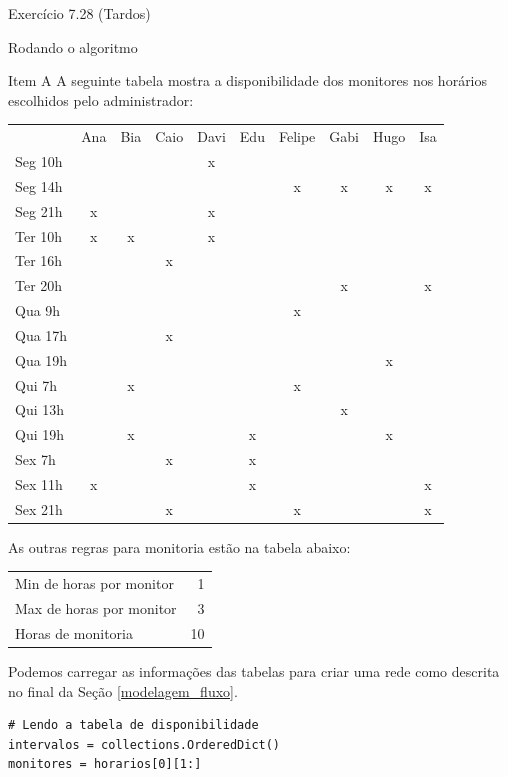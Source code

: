 \documentclass[presentation]{beamer}
\begin{document}
\begin{frame}[fragile,label=sec-2]{Exercício 7.28 (Tardos)}
\begin{block}{Rodando o algoritmo}
\begin{block}{Item A}
A seguinte tabela mostra a disponibilidade dos monitores nos horários
escolhidos pelo administrador:

\begin{center}
\begin{tabular}{lccccccccc}
 & Ana & Bia & Caio & Davi & Edu & Felipe & Gabi & Hugo & Isa\\
Seg 10h &  &  &  & x &  &  &  &  & \\
Seg 14h &  &  &  &  &  & x & x & x & x\\
Seg 21h & x &  &  & x &  &  &  &  & \\
Ter 10h & x & x &  & x &  &  &  &  & \\
Ter 16h &  &  & x &  &  &  &  &  & \\
Ter 20h &  &  &  &  &  &  & x &  & x\\
Qua 9h &  &  &  &  &  & x &  &  & \\
Qua 17h &  &  & x &  &  &  &  &  & \\
Qua 19h &  &  &  &  &  &  &  & x & \\
Qui 7h &  & x &  &  &  & x &  &  & \\
Qui 13h &  &  &  &  &  &  & x &  & \\
Qui 19h &  & x &  &  & x &  &  & x & \\
Sex 7h &  &  & x &  & x &  &  &  & \\
Sex 11h & x &  &  &  & x &  &  &  & x\\
Sex 21h &  &  & x &  &  & x &  &  & x\\
\end{tabular}
\end{center}
As outras regras para monitoria estão na tabela abaixo:

\begin{center}
\begin{tabular}{lr}
Min de horas por monitor & 1\\
Max de horas por monitor & 3\\
Horas de monitoria & 10\\
\end{tabular}
\end{center}

Podemos carregar as informações das tabelas para criar uma rede como
descrita no final da Seção \ref{modelagem_fluxo}.
\begin{verbatim}
# Lendo a tabela de disponibilidade
intervalos = collections.OrderedDict()
monitores = horarios[0][1:]


\end{verbatim}
\end{block}
\end{block}
\end{frame}
\end{document}
